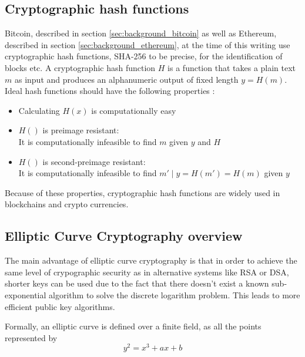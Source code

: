 \documentclass[12pt,msc,a4paper,oneside]{ucl_thesis}
\begin{document}
\subsection{Cryptographic hash functions}
Bitcoin, described in section \ref{sec:background_bitcoin} as well as Ethereum, described in section \ref{sec:background_ethereum}, at the time of this writing use cryptographic hash functions, SHA-256 to be precise, for the identification of blocks etc. A cryptographic hash function $H$ is a function that takes a plain text $m$ as input and produces an alphanumeric output of fixed length $y = H(m)$. Ideal hash functions should have the following properties \cite{BKarp} \cite{wiki:cryptographic_hash_fn}:
\begin{itemize}
    \item{Calculating $H(x)$ is computationally easy}
    \item{$H()$ is preimage resistant: } \\ It is computationally infeasible to find $m$ given $y$ and $H$
    \item{$H()$ is second-preimage resistant: } \\ It is computationally infeasible to find $m' \mid y=H(m')=H(m)$ given $y$
\end{itemize}
Because of these properties, cryptographic hash functions are widely used in blockchains and crypto currencies.

\subsection{Elliptic Curve Cryptography overview} \label{sec:background_elliptic_curve}
The main advantage of elliptic curve cryptography is that in order to achieve the same level of crypographic security as in alternative systems like RSA or DSA, shorter keys can be used due to the fact that there doesn't exist a known sub-exponential algorithm to solve the discrete logarithm problem. This leads to more efficient public key algorithms. \cite{EllipticCurveOverview} \cite{Araki1998}

Formally, an elliptic curve is defined over a finite field, as all the points represented by
\begin{equation}
    y^2 = x^3 + ax + b
\end{equation}
\end{document}
